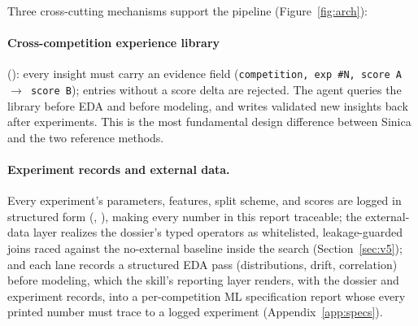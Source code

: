 \documentclass[11pt,a4paper]{article}
\begin{document}
Three cross-cutting mechanisms support the pipeline (Figure~\ref{fig:arch}):

\paragraph{Cross-competition experience library} (): every insight must carry an evidence field (\texttt{competition, exp \#N, score A $\to$ score B}); entries without a score delta are rejected. The agent queries the library before EDA and before modeling, and writes validated new insights back after experiments. This is the most fundamental design difference between Sinica and the two reference methods.

\paragraph{Experiment records and external data.} Every experiment's parameters, features, split scheme, and scores are logged in structured form (, ), making every number in this report traceable; the external-data layer realizes the dossier's typed operators as whitelisted, leakage-guarded joins raced against the no-external baseline inside the search (Section~\ref{sec:v5}); and each lane records a structured EDA pass (distributions, drift, correlation) before modeling, which the skill's reporting layer renders, with the dossier and experiment records, into a per-competition ML specification report whose every printed number must trace to a logged experiment (Appendix~\ref{app:specs}).
\end{document}
